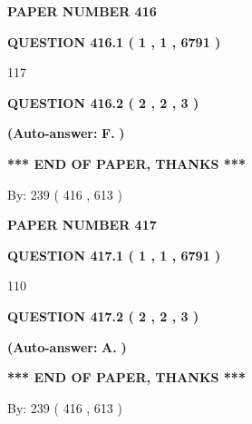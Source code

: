 \documentclass[12pt]{article}
\begin{document}
 
 
   
   
   
   
   
   
 
 
 
 
   
   
   
   
\setcounter{page}{ 
   416001 } 
   
   
 {\textbf{ \Large{ PAPER NUMBER  416  }}}
   
   
   
   
  
  
{\textbf{\large{QUESTION
416.1 
 ( 1 , 1 , 6791 )
}}}

117
  
  
{\textbf{\large{QUESTION
416.2 
 ( 2 , 2 , 3 )
}}}
 
 
{\textbf{(Auto-answer:}}
{\textbf{\large{
F.}}}
{\textbf{)}}
 
 
   
   
   
   
\vspace{1.0in} 
{\textbf{\large{ *** END OF PAPER, THANKS *** }}} 
   
   
\hspace{1.0in} By: 
 239 ( 416 ,  613 )
   
   
   
   
\newpage 
\setcounter{page}{ 
   417001 } 
   
   
 {\textbf{ \Large{ PAPER NUMBER  417  }}}
   
   
   
   
  
  
{\textbf{\large{QUESTION
417.1 
 ( 1 , 1 , 6791 )
}}}

110
  
  
{\textbf{\large{QUESTION
417.2 
 ( 2 , 2 , 3 )
}}}
 
 
{\textbf{(Auto-answer:}}
{\textbf{\large{
A.}}}
{\textbf{)}}
 
 
   
   
   
   
\vspace{1.0in} 
{\textbf{\large{ *** END OF PAPER, THANKS *** }}} 
   
   
\hspace{1.0in} By: 
 239 ( 416 ,  613 )
   
   
   
\end{document}
